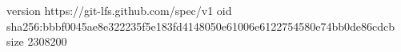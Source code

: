 version https://git-lfs.github.com/spec/v1
oid sha256:bbbf0045ae8e322235f5e183fd4148050e61006e6122754580e74bb0de86cdcb
size 2308200
